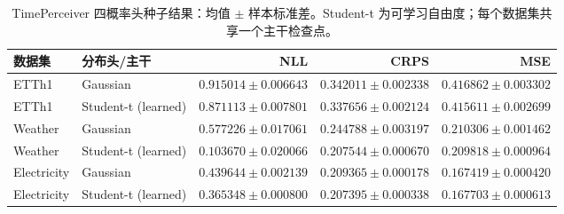 \begin{table}[t]
\centering\small
\caption{TimePerceiver 四概率头种子结果：均值 $\pm$ 样本标准差。Student-t 为可学习自由度；每个数据集共享一个主干检查点。}\label{tab:multiseed}
\begin{tabular}{llrrr}
\toprule
数据集 & 分布头/主干 & NLL & CRPS & MSE \\
\midrule
ETTh1 & Gaussian & $0.915014\pm0.006643$ & $0.342011\pm0.002338$ & $0.416862\pm0.003302$ \\
ETTh1 & Student-t (learned) & $0.871113\pm0.007801$ & $0.337656\pm0.002124$ & $0.415611\pm0.002699$ \\
Weather & Gaussian & $0.577226\pm0.017061$ & $0.244788\pm0.003197$ & $0.210306\pm0.001462$ \\
Weather & Student-t (learned) & $0.103670\pm0.020066$ & $0.207544\pm0.000670$ & $0.209818\pm0.000964$ \\
Electricity & Gaussian & $0.439644\pm0.002139$ & $0.209365\pm0.000178$ & $0.167419\pm0.000420$ \\
Electricity & Student-t (learned) & $0.365348\pm0.000800$ & $0.207395\pm0.000338$ & $0.167703\pm0.000613$ \\
\bottomrule
\end{tabular}
\end{table}
